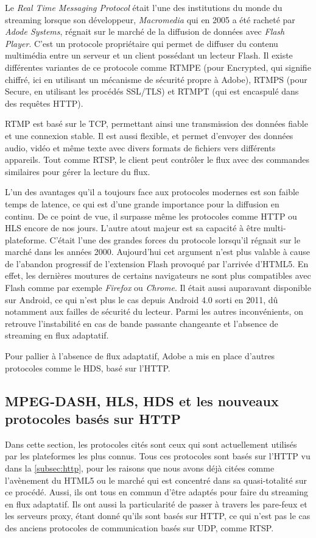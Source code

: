 \documentclass{polytech/polytech}
\begin{document}
Le \textit{Real Time Messaging Protocol} était l’une des institutions du monde du streaming lorsque son développeur, \textit{Macromedia} qui en 2005 a été racheté par \textit{Adode Systems}, régnait sur le marché de la diffusion de données avec \textit{Flash Player}. C’est un protocole propriétaire qui permet de diffuser du contenu multimédia entre un serveur et un client possédant un lecteur Flash. Il existe différentes variantes de ce protocole comme RTMPE (pour Encrypted, qui signifie chiffré, ici en utilisant un mécanisme de sécurité propre à Adobe), RTMPS (pour Secure, en utilisant les procédés SSL/TLS) et RTMPT (qui est encaspulé dans des requêtes HTTP).

RTMP est basé sur le TCP, permettant ainsi une transmission des données fiable et une connexion stable. Il est aussi flexible, et permet d’envoyer des données audio, vidéo et même texte avec divers formats de fichiers vers différents appareils. Tout comme RTSP, le client peut contrôler le flux avec des commandes similaires pour gérer la lecture du flux.

L’un des avantages qu’il a toujours face aux protocoles modernes est son faible temps de latence, ce qui est d’une grande importance pour la diffusion en continu. De ce point de vue, il surpasse même les protocoles comme HTTP ou HLS encore de nos jours. L’autre atout majeur est sa capacité à être multi-plateforme. C’était l’une des grandes forces du protocole lorsqu’il régnait sur le marché dans les années 2000. Aujourd’hui cet argument n’est plus valable à cause de l’abandon progressif de l’extension Flash provoqué par l’arrivée d’HTML5. En effet, les dernières moutures de certains navigateurs ne sont plus compatibles avec Flash comme par exemple \textit{Firefox} ou \textit{Chrome}. Il était aussi auparavant disponible sur Android, ce qui n’est plus le cas depuis Android 4.0 sorti en 2011, dû notamment aux failles de sécurité du lecteur. Parmi les autres inconvénients, on retrouve l’instabilité en cas de bande passante changeante et l’absence de streaming en flux adaptatif.

Pour pallier à l’absence de flux adaptatif, Adobe a mis en place d’autres protocoles comme le HDS, basé sur l’HTTP.


\subsection{MPEG-DASH, HLS, HDS et les nouveaux protocoles basés sur HTTP}
\label{subsec:newProto}

Dans cette section, les protocoles cités sont ceux qui sont actuellement utilisés par les plateformes les plus connus. Tous ces protocoles sont basés sur l’HTTP vu dans la \autoref{subsec:http}, pour les raisons que nous avons déjà citées comme l’avènement du HTML5 ou le marché qui est concentré dans sa quasi-totalité sur ce procédé. Aussi, ils ont tous en commun d’être adaptés pour faire du streaming en flux adaptatif. Ils ont aussi la particularité de passer à travers les pare-feux et les serveurs proxy, étant donné qu’ils sont basés sur HTTP, ce qui n’est pas le cas des anciens protocoles de communication basés sur UDP, comme RTSP.
\end{document}
